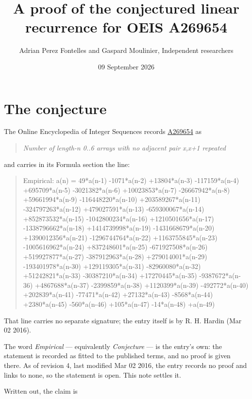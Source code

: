\documentclass[11pt]{article}
\title{A proof of the conjectured linear recurrence for OEIS A269654}
\author{Adrian Perez Fontelles and Gaspard Moulinier, Independent researchers}
\date{09 September 2026}
\theoremstyle{definition}
\begin{document}
\maketitle
\section{The conjecture}

The Online Encyclopedia of Integer Sequences records \href{https://oeis.org/A269654}{A269654} as

\begin{quote}\itshape Number of length-n 0..6 arrays with no adjacent pair x,x+1 repeated\end{quote}

and carries in its Formula section the line:

\begin{quote}\ttfamily Empirical: a(n) = 49*a(n-1) -1071*a(n-2) +13804*a(n-3) -117159*a(n-4) +695709*a(n-5) -3021382*a(n-6) +10023853*a(n-7) -26667942*a(n-8) +59661994*a(n-9) -116448220*a(n-10) +203589267*a(n-11) -324797263*a(n-12) +479027591*a(n-13) -659300067*a(n-14) +852873532*a(n-15) -1042800234*a(n-16) +1210501656*a(n-17) -1338796662*a(n-18) +1414739998*a(n-19) -1431668679*a(n-20) +1390012356*a(n-21) -1296744764*a(n-22) +1163755845*a(n-23) -1005616962*a(n-24) +837248601*a(n-25) -671927508*a(n-26) +519927877*a(n-27) -387912963*a(n-28) +279014001*a(n-29) -193401978*a(n-30) +129119305*a(n-31) -82960080*a(n-32) +51242821*a(n-33) -30387210*a(n-34) +17270445*a(n-35) -9387672*a(n-36) +4867688*a(n-37) -2399859*a(n-38) +1120399*a(n-39) -492772*a(n-40) +202839*a(n-41) -77471*a(n-42) +27132*a(n-43) -8568*a(n-44) +2380*a(n-45) -560*a(n-46) +105*a(n-47) -14*a(n-48) +a(n-49)\end{quote}

That line carries no separate signature; the entry itself is by R. H. Hardin (Mar 02 2016).

The word {\itshape Empirical} --- equivalently {\itshape Conjecture} --- is the entry's own: the statement is recorded as fitted to the published terms, and no proof is given there. As of revision 4, last modified Mar 02 2016, the entry records no proof and links to none, so the statement is open. This note settles it.

Written out, the claim is
\end{document}
